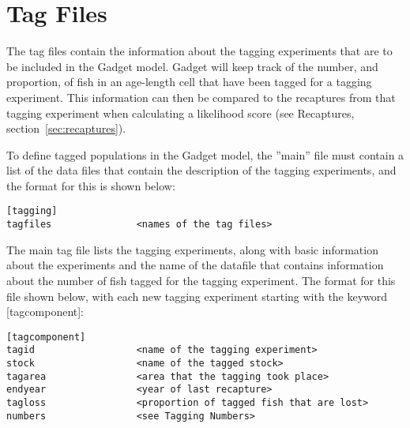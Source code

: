 \documentclass [a4paper, 10pt]{book}
\begin{document}



\chapter{Tag Files}\label{chap:tag}
The tag files contain the information about the tagging experiments that are to be included in the Gadget model.  Gadget will keep track of the number, and proportion, of fish in an age-length cell that have been tagged for a tagging experiment.  This information can then be compared to the recaptures from that tagging experiment when calculating a likelihood score (see Recaptures, section~\ref{sec:recaptures}).

\bigskip
To define tagged populations in the Gadget model, the ''main'' file must contain a list of the data files that contain the description of the tagging experiments, and the format for this is shown below:

{\small\begin{verbatim}
[tagging]
tagfiles               <names of the tag files>
\end{verbatim}}

The main tag file lists the tagging experiments, along with basic information about the experiments and the name of the datafile that contains information about the number of fish tagged for the tagging experiment.  The format for this file shown below, with each new tagging experiment starting with the keyword [tagcomponent]:

{\small\begin{verbatim}
[tagcomponent]
tagid                  <name of the tagging experiment>
stock                  <name of the tagged stock>
tagarea                <area that the tagging took place>
endyear                <year of last recapture>
tagloss                <proportion of tagged fish that are lost>
numbers                <see Tagging Numbers>
\end{verbatim}}
\end{document}
